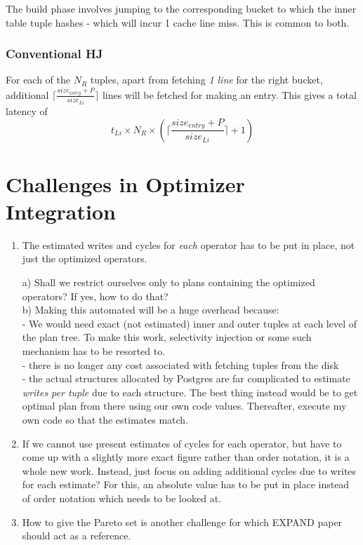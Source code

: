 \documentclass[10pt]{article}
\begin{document}
The build phase involves jumping to the corresponding bucket to which the inner table tuple hashes - which will incur 1 cache line miss. This is common to both. 
\subsubsection{Conventional HJ}
For each of the $N_R$ tuples, apart from fetching \emph{1 line} for the right bucket, additional $\lceil \frac {size_{entry} + P}{size_{Li}} \rceil$ lines will be fetched for making an entry. This gives a total latency of 
\begin{equation}
t_{Li} \times N_R\times (\lceil \frac {size_{entry} + P}{size_{Li}} \rceil + 1)
\end{equation}

\section{Challenges in Optimizer Integration}
\begin{enumerate}
\item The estimated writes and cycles for \emph{each} operator has to be put in place, not just the optimized operators.

a) Shall we restrict ourselves only to plans containing the optimized operators? If yes, how to do that?\\
b) Making this automated will be a huge overhead because:\\
- We would need exact (not estimated) inner and outer tuples at each level of the plan tree. To make this work, selectivity injection or some such mechanism has to be resorted to.\\
- there is no longer any cost associated with fetching tuples from the disk\\
- the actual structures allocated by Postgres are far complicated to estimate \emph{writes per tuple} due to each structure. The best thing instead would be to get optimal plan from there using our own code values. Thereafter, execute my own code so that the estimates match.


\item If we cannot use present estimates of cycles for each operator, but have to come up with a slightly more exact figure rather than order notation, it is a whole new work. Instead, just focus on adding additional cycles due to writes for each estimate? For this, an absolute value has to be put in place instead of order notation which needs to be looked at.

\item How to give the Pareto set is another challenge for which EXPAND paper should act as a reference.


\end{enumerate}
\end{document}
